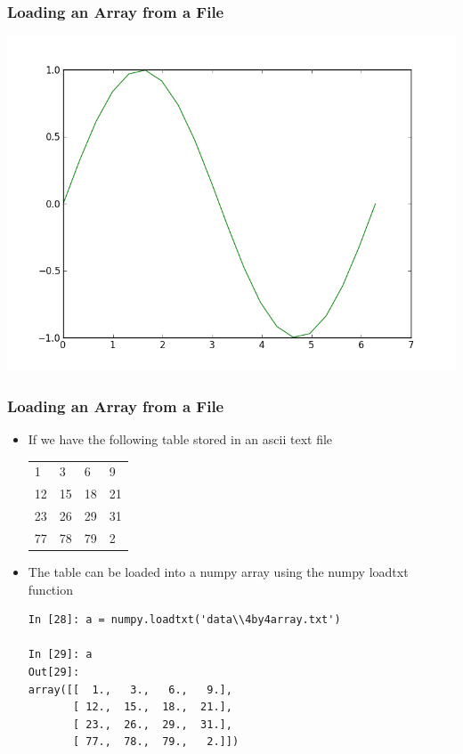 \documentclass{beamer}
\begin{document}
\begin{frame}[fragile]
\frametitle{Loading an Array from a File}
  \centering
    \includegraphics[width=1.\textwidth]{figures/sinx.png} 
\end{frame}

\begin{frame}[fragile]
\frametitle{Loading an Array from a File}
\begin{itemize}
\item{If we have the following table stored in an ascii text file}
\begin{tabular}{l l l l}
  1 & 3 & 6 & 9 \\
  12 & 15 & 18 & 21 \\
  23 & 26 & 29 & 31 \\
  77 & 78 & 79 & 2 \\
\end{tabular}
\item{The table can be loaded into a numpy array using the numpy loadtxt function}
\begin{lstlisting}
In [28]: a = numpy.loadtxt('data\\4by4array.txt')

In [29]: a
Out[29]:
array([[  1.,   3.,   6.,   9.],
       [ 12.,  15.,  18.,  21.],
       [ 23.,  26.,  29.,  31.],
       [ 77.,  78.,  79.,   2.]])
\end{lstlisting}
\end{itemize}
\end{frame}
\end{document}
